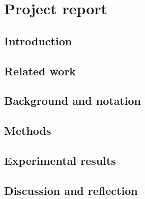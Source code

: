 

\section{Project report}

\subsection{Introduction}

\subsection{Related work}

\subsection{Background and notation}

\subsection{\todo Methods}

\subsection{\todo Experimental results}

\subsection{Discussion and reflection}